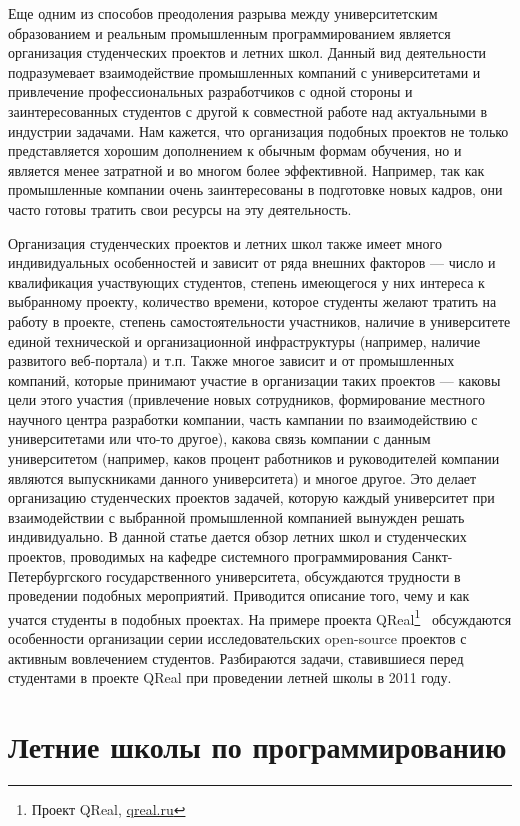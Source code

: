 \documentclass[a4paper]{article}
\begin{document}
Еще одним из способов преодоления разрыва между университетским образованием и реальным промышленным программированием является организация студенческих проектов и летних школ. Данный вид деятельности подразумевает взаимодействие промышленных компаний с университетами и привлечение профессиональных разработчиков с одной стороны и заинтересованных студентов с другой к совместной работе над актуальными в индустрии задачами. Нам кажется, что организация подобных проектов не только представляется хорошим дополнением к обычным формам обучения, но и является менее затратной и во многом более эффективной. Например, так как промышленные компании очень заинтересованы в подготовке новых кадров, они часто готовы тратить свои ресурсы на эту деятельность.

Организация студенческих проектов и летних школ также имеет много индивидуальных особенностей и зависит от ряда внешних факторов --- число и квалификация участвующих студентов, степень имеющегося у них интереса к выбранному проекту, количество времени, которое студенты желают тратить на работу в проекте, степень самостоятельности участников, наличие в университете единой технической и организационной инфраструктуры (например, наличие развитого веб-портала) и т.п. Также многое зависит и от промышленных компаний, которые принимают участие в организации таких проектов --- каковы цели этого участия (привлечение новых сотрудников, формирование местного научного центра разработки компании, часть кампании по взаимодействию с университетами или что-то другое), какова связь компании с данным университетом (например, каков процент работников и руководителей компании являются выпускниками данного университета) и многое другое. Это делает организацию студенческих проектов задачей, которую каждый университет при взаимодействии с выбранной промышленной компанией вынужден решать индивидуально. В данной статье дается обзор летних школ и студенческих проектов, проводимых на кафедре системного программирования Санкт-Петербургского государственного университета, обсуждаются трудности в проведении подобных мероприятий. Приводится описание того, чему и как учатся студенты в подобных проектах. На примере проекта QReal\footnote{Проект QReal, \url{qreal.ru}}~\cite{qreal2, qreal3, qreal} обсуждаются особенности организации серии исследовательских open-source проектов с активным вовлечением студентов. Разбираются задачи, ставившиеся перед студентами в проекте QReal при проведении летней школы в 2011 году.

\section{Летние школы по программированию}
\end{document}
